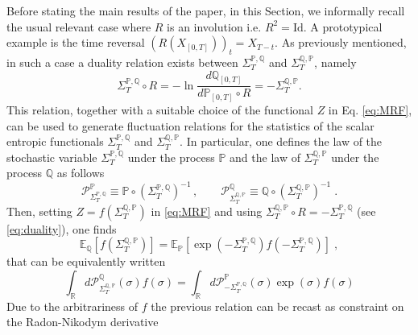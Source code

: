 \documentclass[a4paper,11pt]{article}
\numberwithin{equation}{section}
\begin{document}
Before stating the main results of the paper, in this Section, we informally recall the usual relevant case \cite{Mae99,LS99,CG08,Sei12,Rol+24} where $R$ is an involution i.e. $R^{2}=\mathrm{Id}$.
A prototypical example is the time reversal $\left(R\left(X_{\left[0,T\right]}\right)\right)_{t}=X_{T-t}$. As previously mentioned, in such a case a duality relation exists between $\varSigma_{T}^{\mathbb{P},\mathbb{Q}}$ and $\varSigma_{T}^{\mathbb{Q},\mathbb{P}}$, namely
\begin{equation}\label{eq:duality}
    \varSigma_{T}^{\mathbb{P},\mathbb{Q}}\circ R=-\ln\frac{d\mathbb{Q}_{\left[0,T\right]}}{d\mathbb{P}_{\left[0,T\right]}\circ R}=-\varSigma_{T}^{\mathbb{Q},\mathbb{P}}.
\end{equation}
This relation, together with a suitable choice of the functional $Z$ in Eq. \eqref{eq:MRF}, can be used to generate fluctuation relations for the statistics of the scalar entropic functionals $\varSigma_{T}^{\mathbb{P},\mathbb{Q}}$ and $\varSigma_{T}^{\mathbb{Q},\mathbb{P}}$. 
In particular, one defines the law of the stochastic variable $\varSigma_{T}^{\mathbb{P},\mathbb{Q}}$ under the process $\mathbb{P}$ and the law of $\varSigma_{T}^{\mathbb{Q},\mathbb{P}}$ under the process $\mathbb{Q}$ as follows
\begin{equation}
    \mathcal{P}_{\varSigma_{T}^{\mathbb{P},\mathbb{Q}}}^\mathbb{P} \equiv \mathbb{P} \circ (\varSigma_{T}^{\mathbb{P},\mathbb{Q}})^{-1} \,, \qquad  \mathcal{P}_{\varSigma_{T}^{\mathbb{Q},\mathbb{P}}}^\mathbb{Q} \equiv \mathbb{Q} \circ (\varSigma_{T}^{\mathbb{Q},\mathbb{P}})^{-1} \;.
\end{equation}
Then, setting $Z=f(\varSigma_{T}^{\mathbb{Q},\mathbb{P}})$ in \eqref{eq:MRF} and using $\varSigma_{T}^{\mathbb{Q},\mathbb{P}} \circ R = - \varSigma_{T}^{\mathbb{P},\mathbb{Q}}$ (see \eqref{eq:duality}), one finds
\begin{equation}
  \mathbb{E}_{\mathbb{Q}}\left[ f(\varSigma_{T}^{\mathbb{Q},\mathbb{P}}) \right] = \mathbb{E}_{\mathbb{P}}\left[ \exp\left(-\varSigma_{T}^{\mathbb{P},\mathbb{Q}}\right) f(-\varSigma_{T}^{\mathbb{P},\mathbb{Q}}) \right]   \;,
\end{equation}
that can be equivalently written
\begin{equation}
    \int_{\mathbb{R}} d\mathcal{P}_{\varSigma_{T}^{\mathbb{Q},\mathbb{P}}}^\mathbb{Q} (\sigma) f(\sigma) = \int_{\mathbb{R}} d\mathcal{P}_{-\varSigma_{T}^{\mathbb{P},\mathbb{Q}}}^\mathbb{P} (\sigma) \exp(\sigma) f(\sigma)
\end{equation}
Due to the arbitrariness of $f$ the previous relation can be recast as constraint on the Radon-Nikodym derivative
\end{document}
